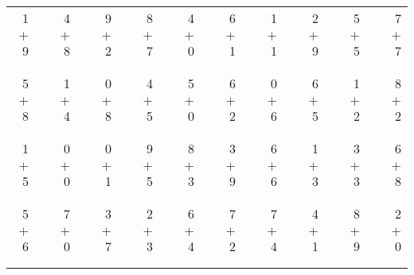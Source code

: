 \documentclass[12pt, letterpaper]{article}
\begin{document}
\begin{tabular}{rrrrrrrrrrrrrrrrrrr}
1 & & 4 & & 9 & & 8 & & 4 & & 6 & & 1 & & 2 & & 5 & & 7\\
$+$ 9 & & $+$ 8 & & $+$ 2 & & $+$ 7 & & $+$ 0 & & $+$ 1 & & $+$ 1 & & $+$ 9 & & $+$ 5 & & $+$ 7\\
\cline{1-1} \cline{3-3} \cline{5-5} \cline{7-7} \cline{9-9} \cline{11-11} \cline{13-13} \cline{15-15} \cline{17-17} \cline{19-19} \\ \\
5 & & 1 & & 0 & & 4 & & 5 & & 6 & & 0 & & 6 & & 1 & & 8\\
$+$ 8 & & $+$ 4 & & $+$ 8 & & $+$ 5 & & $+$ 0 & & $+$ 2 & & $+$ 6 & & $+$ 5 & & $+$ 2 & & $+$ 2\\
\cline{1-1} \cline{3-3} \cline{5-5} \cline{7-7} \cline{9-9} \cline{11-11} \cline{13-13} \cline{15-15} \cline{17-17} \cline{19-19} \\ \\
1 & & 0 & & 0 & & 9 & & 8 & & 3 & & 6 & & 1 & & 3 & & 6\\
$+$ 5 & & $+$ 0 & & $+$ 1 & & $+$ 5 & & $+$ 3 & & $+$ 9 & & $+$ 6 & & $+$ 3 & & $+$ 3 & & $+$ 8\\
\cline{1-1} \cline{3-3} \cline{5-5} \cline{7-7} \cline{9-9} \cline{11-11} \cline{13-13} \cline{15-15} \cline{17-17} \cline{19-19} \\ \\
5 & & 7 & & 3 & & 2 & & 6 & & 7 & & 7 & & 4 & & 8 & & 2\\
$+$ 6 & & $+$ 0 & & $+$ 7 & & $+$ 3 & & $+$ 4 & & $+$ 2 & & $+$ 4 & & $+$ 1 & & $+$ 9 & & $+$ 0\\
\cline{1-1} \cline{3-3} \cline{5-5} \cline{7-7} \cline{9-9} \cline{11-11} \cline{13-13} \cline{15-15} \cline{17-17} \cline{19-19} \\ \\
\end{tabular}
\newpage
\end{document}
